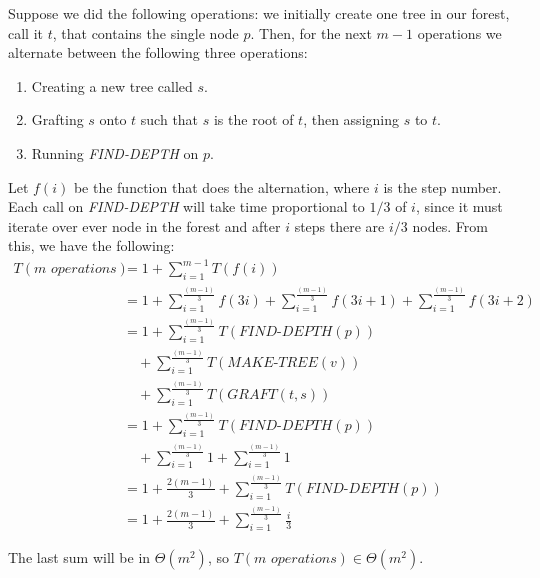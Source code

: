 \documentclass[letterpaper,10pt]{article}
\begin{document}
\begin{enumerate}
\begin{enumerate}
    Suppose we did the following operations: we initially create one tree in our forest, call it $t$, that contains the single node $p$. Then, for the next $m-1$ operations we alternate between the following three operations:
    \begin{enumerate}[1.]
      \item Creating a new tree called $s$.
      \item Grafting $s$ onto $t$ such that $s$ is the root of $t$, then assigning $s$ to $t$.
      \item Running \textit{FIND-DEPTH} on $p$.
    \end{enumerate}
    Let $f(i)$ be the function that does the alternation, where $i$ is the step number. Each call on \textit{FIND-DEPTH} will take time proportional to $1/3$ of $i$, since it must iterate over ever node in the forest and after $i$ steps there are $i/3$ nodes. From this, we have the following:
    \begin{align*}
      T(\textit{m operations}) &= 1 + \sum_{i=1}^{m-1} T(f(i)) \\
      &= 1 + \sum_{i=1}^{\frac{(m-1)}{3}} f(3i) + \sum_{i=1}^{\frac{(m-1)}{3}} f(3i + 1) + \sum_{i=1}^{\frac{(m-1)}{3}} f(3i+2) \\
      &= 1 +\sum_{i=1}^{\frac{(m-1)}{3}} T(\textit{FIND-DEPTH}(p)) \\ & \quad + \sum_{i=1}^{\frac{(m-1)}{3}} T(\textit{MAKE-TREE}(v)) \\ & \quad + \sum_{i=1}^{\frac{(m-1)}{3}} T(\textit{GRAFT}(t, s)) \\
      &= 1 + \sum_{i=1}^{\frac{(m-1)}{3}} T(\textit{FIND-DEPTH}(p)) \\ & \quad + \sum_{i=1}^{\frac{(m-1)}{3}} 1 + \sum_{i=1}^{\frac{(m-1)}{3}} 1 \\
      &= 1 + \frac{2(m-1)}{3} + \sum_{i=1}^{\frac{(m-1)}{3}} T(\textit{FIND-DEPTH}(p)) \\
      &= 1 + \frac{2(m-1)}{3} + \sum_{i=1}^{\frac{(m-1)}{3}} \frac{i}{3}
    \end{align*}

    The last sum will be in $\Theta(m^2)$, so $T(\textit{m operations}) \in \Theta(m^2)$.


\end{enumerate}
\end{enumerate}
\end{document}
